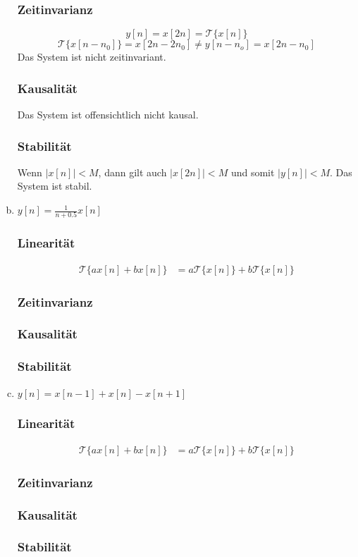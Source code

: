 \begin{enumerate}[a)]
	\subsubsection*{Zeitinvarianz}
		\[ y[n] = x[2n] = \mathcal{T} \{ x[n] \} \]
		\[ \mathcal{T} \{ x[n-n_0] \} = x[2n-2n_0] \neq y[n-n_o] = x[2n-n_0] \]
		Das System ist nicht zeitinvariant.
	\subsubsection*{Kausalität}
		Das System ist offensichtlich nicht kausal.
	\subsubsection*{Stabilität}
		Wenn $|x[n]|<M$, dann gilt auch $|x[2n]| < M$ und somit $|y[n]|<M$. Das System ist stabil.
	\item $y[n] = \frac{1}{n+0.5}x[n]$
	\subsubsection*{Linearität}
		\begin{align*}
			\mathcal{T} \{ ax[n]+bx[n] \} &= a\mathcal{T} \{ x[n] \}+ b \mathcal{T} \{ x[n] \}
		\end{align*}
	\subsubsection*{Zeitinvarianz}
	\subsubsection*{Kausalität}
	\subsubsection*{Stabilität}
	\item $y[n]=x[n-1]+x[n]-x[n+1]$
	\subsubsection*{Linearität}
		\begin{align*}
			\mathcal{T} \{ ax[n]+bx[n] \} &= a\mathcal{T} \{ x[n] \}+ b \mathcal{T} \{ x[n] \}
		\end{align*}
	\subsubsection*{Zeitinvarianz}
	\subsubsection*{Kausalität}
	\subsubsection*{Stabilität}
\end{enumerate}